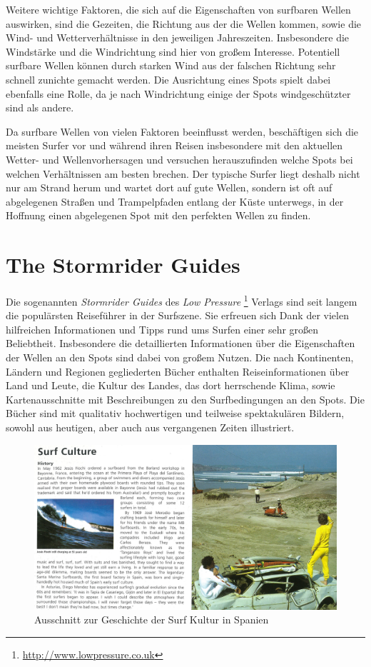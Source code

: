 Weitere wichtige Faktoren, die sich auf die Eigenschaften von
surfbaren Wellen auswirken, sind die Gezeiten, die Richtung aus der
die Wellen kommen, sowie die Wind- und Wetterverhältnisse in den
jeweiligen Jahreszeiten. Insbesondere die Windstärke und die
Windrichtung sind hier von großem Interesse. Potentiell surfbare
Wellen können durch starken Wind aus der falschen Richtung sehr
schnell zunichte gemacht werden. Die Ausrichtung eines Spots spielt
dabei ebenfalls eine Rolle, da je nach Windrichtung einige der Spots
windgeschützter sind als andere.

Da surfbare Wellen von vielen Faktoren beeinflusst werden,
beschäftigen sich die meisten Surfer vor und während ihren Reisen
insbesondere mit den aktuellen Wetter- und Wellenvorhersagen und
versuchen herauszufinden welche Spots bei welchen Verhältnissen am
besten brechen. Der typische Surfer liegt deshalb nicht nur am Strand
herum und wartet dort auf gute Wellen, sondern ist oft auf abgelegenen
Straßen und Trampelpfaden entlang der Küste unterwegs, in der Hoffnung
einen abgelegenen Spot mit den perfekten Wellen zu finden.

\section{The Stormrider Guides}
Die sogenannten \textit{Stormrider Guides} des \textit{Low Pressure}
\footnote{\url{http://www.lowpressure.co.uk}} Verlags sind seit langem
die populärsten Reiseführer in der Surfszene. Sie erfreuen sich Dank
der vielen hilfreichen Informationen und Tipps rund ums Surfen einer
sehr großen Beliebtheit. Insbesondere die detaillierten Informationen
über die Eigenschaften der Wellen an den Spots sind dabei von großem
Nutzen. Die nach Kontinenten, Ländern und Regionen gegliederten Bücher
enthalten Reiseinformationen über Land und Leute, die Kultur des
Landes, das dort herrschende Klima, sowie Kartenausschnitte mit
Beschreibungen zu den Surfbedingungen an den Spots. Die Bücher sind
mit qualitativ hochwertigen und teilweise spektakulären Bildern,
sowohl aus heutigen, aber auch aus vergangenen Zeiten illustriert.

\begin{figure}[h]
  \includegraphics[width=\textwidth]{bilder/surf-culture}
  \caption{Ausschnitt zur Geschichte der Surf Kultur in Spanien}
  \label{surf-culture}
\end{figure}

